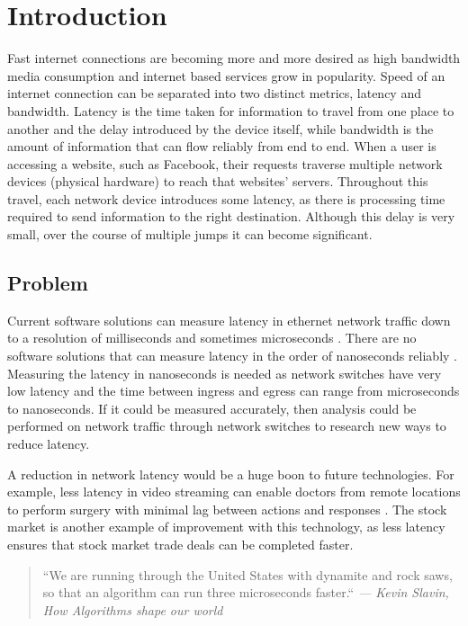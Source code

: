 \chapter{Introduction}\label{C:intro}

\par Fast internet connections are becoming more and more desired as high bandwidth media consumption and internet based services grow in popularity. 
Speed of an internet connection can be separated into two distinct metrics, latency and bandwidth. 
Latency is the time taken for information to travel from one place to another and the delay introduced by the device itself, while bandwidth is the amount of information that can flow reliably from end to end.
When a user is accessing a website, such as Facebook, their requests traverse multiple network devices
(physical hardware) to reach that websites’ servers. Throughout this travel, each network device
introduces some latency, as there is processing time required to send information to the right
destination. Although this delay is very small, over the course of multiple jumps it can become
significant.

\section{Problem}

\par Current software solutions can measure latency in ethernet network traffic down to a resolution of
milliseconds and sometimes microseconds \cite{pingisbad}. There are no software solutions that can measure
latency in the order of nanoseconds reliably \cite{timeinlinux}. Measuring the latency in nanoseconds is needed as
network switches have very low latency and the time between ingress and egress can range from
microseconds to nanoseconds. If it could be measured accurately, then analysis could be performed
on network traffic through network switches to research new ways to reduce latency.

\par A reduction in network latency would be a huge boon to future technologies. For example, less
latency in video streaming can enable doctors from remote locations to perform surgery with
minimal lag between actions and responses \cite{remotesurgery}. The stock market is another example of improvement with
this technology, as less latency ensures that stock market trade deals can be completed faster.

\begin{quote}
    \centering
    ``We are running through the United States with dynamite and rock saws, so that an algorithm can
    run three microseconds faster.`` \em --- Kevin Slavin, How Algorithms shape our world \cite{tedTalkAlgorithms}
\end{quote} 

